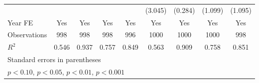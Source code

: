 \begin{table}[htbp]
\begin{tabular}{l*{8}{c}}
                &                  &                  &                  &                  &  (3.045)         &  (0.284)         &  (1.099)         &  (1.095)         \\
\addlinespace
Year FE         &      Yes         &      Yes         &      Yes         &      Yes         &      Yes         &      Yes         &      Yes         &      Yes         \\
\midrule
Observations    &      998         &      998         &      998         &      996         &     1000         &     1000         &     1000         &      998         \\
\(R^{2}\)       &    0.546         &    0.937         &    0.757         &    0.849         &    0.563         &    0.909         &    0.758         &    0.851         \\
\bottomrule
\multicolumn{9}{l}{\footnotesize Standard errors in parentheses}\\
\multicolumn{9}{l}{\footnotesize \sym{+} \(p<0.10\), \sym{*} \(p<0.05\), \sym{**} \(p<0.01\), \sym{***} \(p<0.001\)}\\
\end{tabular}
\end{table}
